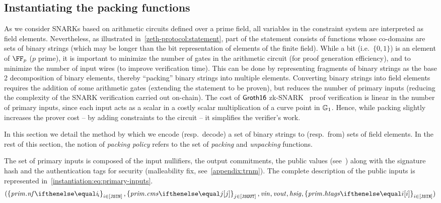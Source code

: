 \subsection{Instantiating the packing functions}\label{instantiation:statement:pack}

As we consider SNARKs based on arithmetic circuits defined over a prime field, all variables in the constraint system are interpreted as field elements. Nevertheless, as illustrated in~\cref{zeth-protocol:statement}, part of the statement consists of functions whose co-domains are sets of binary strings (which may be longer than the bit representation of elements of the finite field). While a bit (i.e.~$\{0, 1\}$) is an element of $\FF_p$ ($p$ prime), it is important to minimize the number of gates in the arithmetic circuit (for proof generation efficiency), and to minimize the number of input wires (to improve verification time). This can be done by representing fragments of binary strings as the base 2 decomposition of binary elements, thereby ``packing'' binary strings into multiple elements. Converting binary strings into field elements requires the addition of some arithmetic gates (extending the statement to be proven), but reduces the number of primary inputs (reducing the complexity of the SNARK verification carried out on-chain).
The cost of $\mathsf{Groth16}$ zk-SNARK~\cite{groth2016size} proof verification is linear in the number of primary inputs, since each input acts as a scalar in a costly scalar multiplication of a curve point in $\mathbb{G}_1$. Hence, while packing slightly increases the prover cost -- by adding constraints to the circuit -- it simplifies the verifier's work.

In this section we detail the method by which we encode (resp.~decode) a set of binary strings to (resp.~from) sets of field elements. In the rest of this section, the notion of \emph{packing policy} refers to the set of \emph{packing} and \emph{unpacking} functions.

The set of primary inputs is composed of the input nullifiers, the output commitments, the public values (see~\cite[Section 3.4.3]{zethpaper}) along with the signature hash and the authentication tags for security (malleability fix, see~\cref{appendix:trnm}). The complete description of the public inputs is represented in~\cref{instantiation:eq:primary-inputs}.
%
\begin{equation}\label{instantiation:eq:primary-inputs}
    (\indexedset{\priminputs.\nf{i}}{i \in [\jsin]}, \indexedset{\priminputs.\cms{j}}{j \in [\jsout]}, \vin, \vout, \hsig, \indexedset{\priminputs.\htags{i}}{i \in [\jsin]})
\end{equation}

